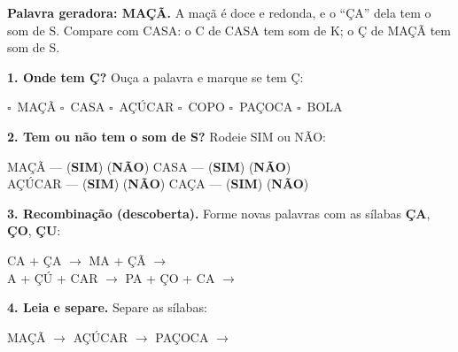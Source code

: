 
\begin{somletra}
\textbf{Palavra geradora: \textsc{MA\c{C}\~A}.} A ma\c{c}\~a \'e doce e redonda, e o ``\c{C}A'' dela tem o som de S. Compare com CASA: o C de CASA tem som de K; o \c{C} de MA\c{C}\~A tem som de S.

\textbf{1. Onde tem \c{C}?} Ou\c{c}a a palavra e marque se tem \c{C}:
\begin{center}
$\square$~MA\c{C}\~A \quad $\square$~CASA \quad $\square$~A\c{C}\'UCAR \quad $\square$~COPO \quad $\square$~PA\c{C}OCA \quad $\square$~BOLA
\end{center}

\textbf{2. Tem ou n\~ao{} tem o som de S?} Rodeie SIM ou N\~AO:
\begin{center}
MA\c{C}\~A --- (\textbf{SIM}) (\textbf{N\~AO}) \quad CASA --- (\textbf{SIM}) (\textbf{N\~AO}) \\ A\c{C}\'UCAR --- (\textbf{SIM}) (\textbf{N\~AO}) \quad CA\c{C}A --- (\textbf{SIM}) (\textbf{N\~AO})
\end{center}
\end{somletra}

\begin{somsilaba}
\textbf{3. Recombina\c{c}\~ao (descoberta).} Forme novas palavras com as s\'ilabas \textbf{\c{C}A}, \textbf{\c{C}O}, \textbf{\c{C}U}:
\begin{center}
CA + \c{C}A $\rightarrow$ \underline{\hspace{2cm}} \quad MA + \c{C}\~A $\rightarrow$ \underline{\hspace{2cm}} \\
A + \c{C}\'U + CAR $\rightarrow$ \underline{\hspace{2cm}} \quad PA + \c{C}O + CA $\rightarrow$ \underline{\hspace{2cm}}
\end{center}
\textbf{4. Leia e separe.} Separe as s\'ilabas:
\begin{center}
MA\c{C}\~A $\rightarrow$ \underline{\hspace{2cm}} \quad A\c{C}\'UCAR $\rightarrow$ \underline{\hspace{2cm}} \quad PA\c{C}OCA $\rightarrow$ \underline{\hspace{2cm}}
\end{center}
\end{somsilaba}

